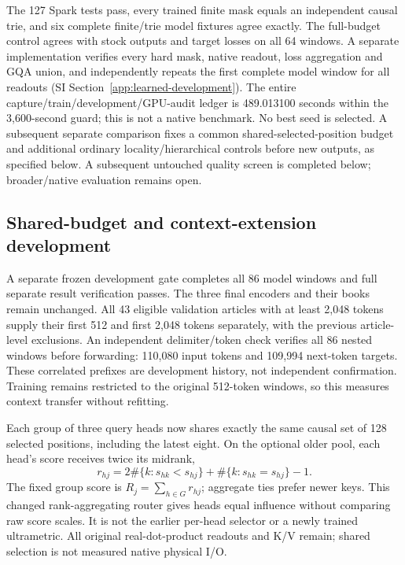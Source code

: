 \documentclass[11pt]{article}
\begin{document}
The 127 Spark tests pass, every trained finite mask equals an independent
causal trie, and six complete finite/trie model fixtures agree exactly.
The full-budget control agrees with stock outputs and target losses on all
64 windows. A separate implementation verifies every hard mask, native readout,
loss aggregation and GQA union, and independently repeats the first complete
model window for all readouts (SI Section~\ref{app:learned-development}).
The entire capture/train/development/GPU-audit ledger is 489.013100 seconds
within the 3,600-second guard; this is not a native benchmark. No best seed
is selected. A subsequent separate comparison fixes a common shared-selected-position
budget and additional ordinary locality/hierarchical controls before new outputs,
as specified below. A subsequent untouched quality screen is completed below;
broader/native evaluation remains open.

\subsection{Shared-budget and context-extension development}
\label{sec:shared-budget-design}

A separate frozen development gate completes all 86 model windows and full
separate result verification passes. The three final encoders and
their books remain unchanged. All 43 eligible validation articles with at
least 2,048 tokens supply their first 512 and first 2,048 tokens separately,
with the previous article-level exclusions. An independent delimiter/token
check verifies all 86 nested windows before forwarding: 110,080 input tokens
and 109,994 next-token targets. These correlated prefixes are development
history, not independent confirmation. Training remains restricted to the
original 512-token windows, so this measures context transfer without refitting.

Each group of three query heads now shares exactly the same causal set of
128 selected positions, including the latest eight. On the optional older
pool, each head's score receives twice its midrank,
\[
 r_{hj}=2\#\{k:s_{hk}<s_{hj}\}+\#\{k:s_{hk}=s_{hj}\}-1.
\]
The fixed group score is \(R_j=\sum_{h\in G}r_{hj}\); aggregate ties prefer
newer keys. This changed rank-aggregating router gives heads equal influence
without comparing raw score scales. It is not the earlier per-head selector
or a newly trained ultrametric. All original real-dot-product readouts and
K/V remain; shared selection is not measured native physical I/O.
\end{document}
